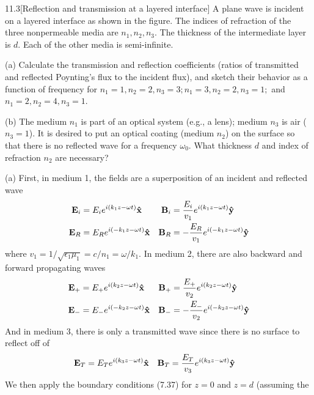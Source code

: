 \documentclass[12pt]{article}
\begin{document}
\begin{problem}{11.3}[Reflection and transmission at a layered interface]
A plane wave is incident on a layered interface as shown in the figure. The
indices of refraction of the three nonpermeable media are $n_1,n_2,n_3$. The
thickness of the intermediate layer is $d$. Each of the other media is
semi-infinite.

(a) Calculate the transmission and reflection coefficients (ratios of
transmitted and reflected Poynting's flux to the incident flux), and sketch
their behavior as a function of frequency for
$n_1=1,n_2=2,n_3=3;n_1=3,n_2=2,n_3=1;$ and $n_1=2,n_2=4,n_3=1$.

(b) The medium $n_1$ is part of an optical system (e.g., a lens); medium $n_3$
is air ($n_3=1$). It is desired to put an optical coating (medium $n_2$) on the
surface so that there is no reflected wave for a frequency $\omega_0$. What
thickness $d$ and index of refraction $n_2$ are necessary?
\begin{solution}
(a) First, in medium 1, the fields are a superposition of an incident and
reflected wave
\begin{align}
    \vb{E}_i&=E_ie^{i(k_1z-\omega t)}\vb{\hat{x}} &
    \vb{B}_i&=\frac{E_i}{v_1}e^{i(k_1z-\omega t)}\vb{\hat{y}}\notag\\
    \vb{E}_R&=E_Re^{i(-k_1z-\omega t)}\vb{\hat{x}} &
    \vb{B}_R&=-\frac{E_R}{v_1}e^{i(-k_1z-\omega t)}\vb{\hat{y}}\notag\\
\end{align}
where $v_1=1/\sqrt{\epsilon_1\mu_1}=c/n_1=\omega/k_1$. In medium 2, there are
also backward and forward propagating waves
\begin{align}
    \vb{E}_+&=E_+e^{i(k_2z-\omega t)}\vb{\hat{x}} &
    \vb{B}_+&=\frac{E_+}{v_2}e^{i(k_2z-\omega t)}\vb{\hat{y}}\notag\\
    \vb{E}_-&=E_-e^{i(-k_2z-\omega t)}\vb{\hat{x}} &
    \vb{B}_-&=-\frac{E_-}{v_2}e^{i(-k_2z-\omega t)}\vb{\hat{y}}\notag\\
\end{align}
And in medium 3, there is only a transmitted wave since there is no surface to
reflect off of
\begin{align}
    \vb{E}_T&=E_Te^{i(k_3z-\omega t)}\vb{\hat{x}} &
    \vb{B}_T&=\frac{E_T}{v_3}e^{i(k_3z-\omega t)}\vb{\hat{y}}
\end{align}
We then apply the boundary conditions (7.37) for $z=0$ and $z=d$ (assuming the

\end{solution}
\end{problem}
\end{document}
